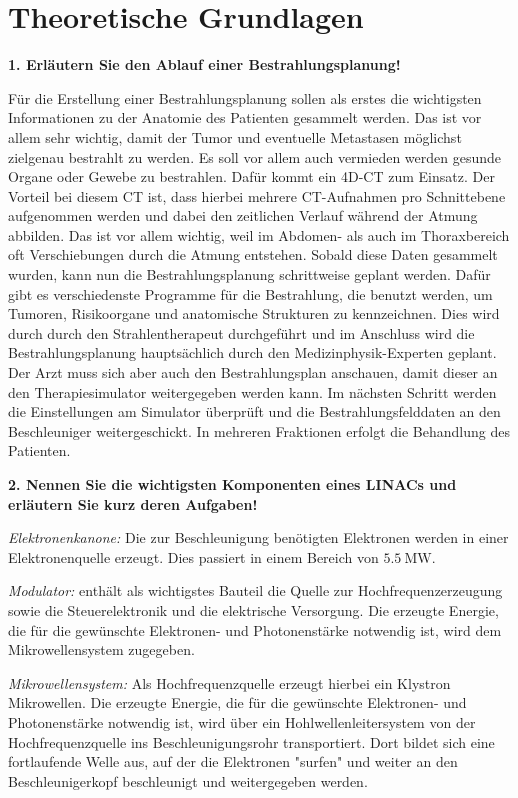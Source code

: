 \section{Theoretische Grundlagen}
\label{sec:Theorie}

\textbf{1. Erläutern Sie den Ablauf einer Bestrahlungsplanung!}

Für die Erstellung einer Bestrahlungsplanung sollen als erstes die wichtigsten Informationen zu der Anatomie des Patienten gesammelt werden. Das ist vor allem sehr wichtig, damit der Tumor und eventuelle Metastasen möglichst zielgenau bestrahlt zu werden. Es soll vor allem auch vermieden werden gesunde Organe oder Gewebe zu bestrahlen.
Dafür kommt ein 4D-CT zum Einsatz. Der Vorteil bei diesem CT ist, dass hierbei mehrere CT-Aufnahmen pro Schnittebene aufgenommen werden und dabei den zeitlichen Verlauf während der Atmung abbilden. Das ist vor allem wichtig, weil im Abdomen- als auch im Thoraxbereich oft Verschiebungen durch die Atmung entstehen.
Sobald diese Daten gesammelt wurden, kann nun die Bestrahlungsplanung schrittweise geplant werden. Dafür gibt es verschiedenste Programme für die Bestrahlung, die benutzt werden, um Tumoren, Risikoorgane und anatomische Strukturen zu kennzeichnen. Dies wird durch durch den Strahlentherapeut durchgeführt und im Anschluss wird die Bestrahlungsplanung hauptsächlich durch den Medizinphysik-Experten geplant.
Der Arzt muss sich aber auch den Bestrahlungsplan anschauen, damit dieser an den Therapiesimulator weitergegeben werden kann.
Im nächsten Schritt werden die Einstellungen am Simulator überprüft und die Bestrahlungsfelddaten an den Beschleuniger weitergeschickt. In mehreren Fraktionen erfolgt die Behandlung des Patienten.

\textbf{2. Nennen Sie die wichtigsten Komponenten eines LINACs und erläutern Sie kurz deren Aufgaben!}

\emph{Elektronenkanone:} Die zur Beschleunigung benötigten Elektronen werden in einer Elektronenquelle erzeugt. Dies passiert in einem Bereich von $\SI{5,5}{\mega\watt}$. 

\emph{Modulator:} enthält als wichtigstes Bauteil die Quelle zur Hochfrequenzerzeugung sowie die Steuerelektronik und die elektrische Versorgung. Die erzeugte Energie, die für die gewünschte Elektronen- und Photonenstärke notwendig ist, wird dem Mikrowellensystem zugegeben.

\emph{Mikrowellensystem:} Als Hochfrequenzquelle erzeugt hierbei ein Klystron Mikrowellen. Die erzeugte Energie, die für die gewünschte Elektronen- und Photonenstärke notwendig ist, wird über ein Hohlwellenleitersystem von der Hochfrequenzquelle ins Beschleunigungsrohr transportiert. Dort bildet sich eine fortlaufende Welle aus, auf der die Elektronen "surfen" und weiter an den Beschleunigerkopf beschleunigt und weitergegeben werden.

